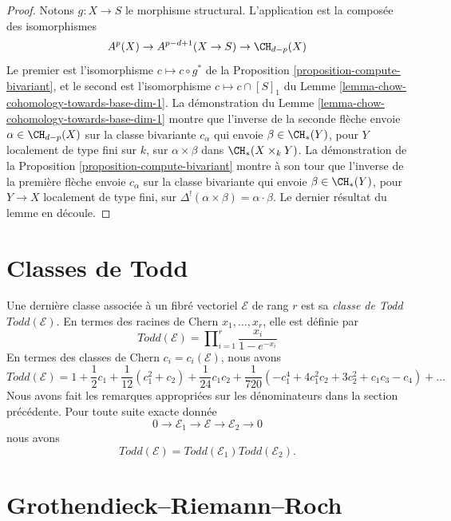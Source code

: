\begin{proof}
Notons $g : X \to S$ le morphisme structural.
L'application est la composée des isomorphismes
$$
A^p(X) \to A^{p - d + 1}(X \to S) \to \CH_{d - p}(X)
$$
Le premier est l'isomorphisme $c \mapsto c \circ g^*$ de la
Proposition \ref{proposition-compute-bivariant},
et le second est l'isomorphisme $c \mapsto c \cap [S]_1$ du
Lemme \ref{lemma-chow-cohomology-towards-base-dim-1}.
La démonstration du Lemme \ref{lemma-chow-cohomology-towards-base-dim-1}
montre que l'inverse de la seconde flèche envoie $\alpha \in \CH_{d - p}(X)$
sur la classe bivariante $c_\alpha$ qui envoie $\beta \in \CH_*(Y)$,
pour $Y$ localement de type fini sur $k$,
sur $\alpha \times \beta$ dans $\CH_*(X \times_k Y)$. La démonstration de la
Proposition \ref{proposition-compute-bivariant} montre à son tour que l'inverse
de la première flèche envoie $c_\alpha$ sur la classe bivariante
qui envoie $\beta \in \CH_*(Y)$, pour $Y \to X$ localement de type fini,
sur $\Delta^!(\alpha \times \beta) = \alpha \cdot \beta$.
Le dernier résultat du lemme en découle.
\end{proof}










\section{Classes de Todd}
\label{section-todd-classes}

\noindent
Une dernière classe associée à un fibré vectoriel $\mathcal{E}$
de rang $r$ est sa {\it classe de Todd} $Todd(\mathcal{E})$.
En termes des racines de Chern $x_1, \ldots, x_r$, elle est
définie par
$$
Todd(\mathcal{E})
=
\prod\nolimits_{i = 1}^r
\frac{x_i}{1 - e^{-x_i}}
$$
En termes des classes de Chern $c_i = c_i(\mathcal{E})$,
nous avons
$$
Todd(\mathcal{E})
=
1
+
\frac{1}{2}c_1
+
\frac{1}{12}(c_1^2 + c_2)
+
\frac{1}{24}c_1c_2
+
\frac{1}{720}(-c_1^4 + 4c_1^2c_2 + 3c_2^2 + c_1c_3 - c_4)
+
\ldots
$$
Nous avons fait les remarques appropriées sur les dénominateurs
dans la section précédente. Pour toute suite exacte
donnée
$$
0
\to
{\mathcal E}_1
\to
{\mathcal E}
\to
{\mathcal E}_2
\to
0
$$
nous avons
$$
Todd({\mathcal E}) = Todd({\mathcal E}_1) Todd({\mathcal E}_2).
$$







\section{Grothendieck--Riemann--Roch}
\label{section-grr}

